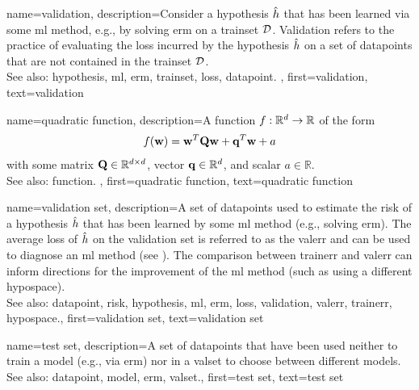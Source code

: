 {name={validation},
	description={Consider a \gls{hypothesis} $\hat{h}$ that has been 
		learned via some \gls{ml} method, e.g., by solving \gls{erm} on a \gls{trainset} $\mathcal{D}$. 
		Validation refers to the practice of evaluating the \gls{loss} incurred by the 
		\gls{hypothesis} $\hat{h}$ on a set of 
		\glspl{datapoint} that are not contained in the \gls{trainset} $\mathcal{D}$.
				\\
		See also: \gls{hypothesis}, \gls{ml}, \gls{erm}, \gls{trainset}, \gls{loss}, \gls{datapoint}. },
	first={validation},
	text={validation}  
}

{name={quadratic function},
	description={A \gls{function} $f: \mathbb{R}^{d} \rightarrow \mathbb{R}$ of the form 
		$$f({\bf w}) =  {\bf w}^{T} \mathbf{Q} \mathbf{w} + \mathbf{q}^{T} {\bf w}+a$$ with 
		some matrix $\mathbf{Q} \in \mathbb{R}^{d \times d}$, vector ${\bf q} \in \mathbb{R}^{d}$, 
		and scalar $a \in \mathbb{R}$.
		\\
		See also: \gls{function}. },
	first={quadratic function},
	text={quadratic function}  
}

{name={validation set},
 	description={A set of \glspl{datapoint} used to estimate 
  		the \gls{risk} of a \gls{hypothesis} $\hat{h}$ that has been learned by some 
  		\gls{ml} method (e.g., solving \gls{erm}). The average \gls{loss} of $\hat{h}$ 
  		on the \gls{validation} set is referred to as the \gls{valerr} and can be used to diagnose an 
  		\gls{ml} method (see \cite[Sec. 6.6]{MLBasics}). The comparison between \gls{trainerr} 
  		and \gls{valerr} can inform directions for the improvement of the \gls{ml} method (such as 
  		using a different \gls{hypospace}).
			\\
		See also: \gls{datapoint}, \gls{risk}, \gls{hypothesis}, \gls{ml}, \gls{erm}, \gls{loss}, \gls{validation}, \gls{valerr}, \gls{trainerr}, \gls{hypospace}.},
	first={validation set},
	text={validation set}  
}

{name={test set},
	description={A set of \glspl{datapoint} that have  
		been used neither to train a \gls{model} (e.g., via \gls{erm}) nor in a \gls{valset} 
		to choose between different \glspl{model}.
				\\
		See also: \gls{datapoint}, \gls{model}, \gls{erm}, \gls{valset}.},
	first={test set},
	text={test set}  
}


